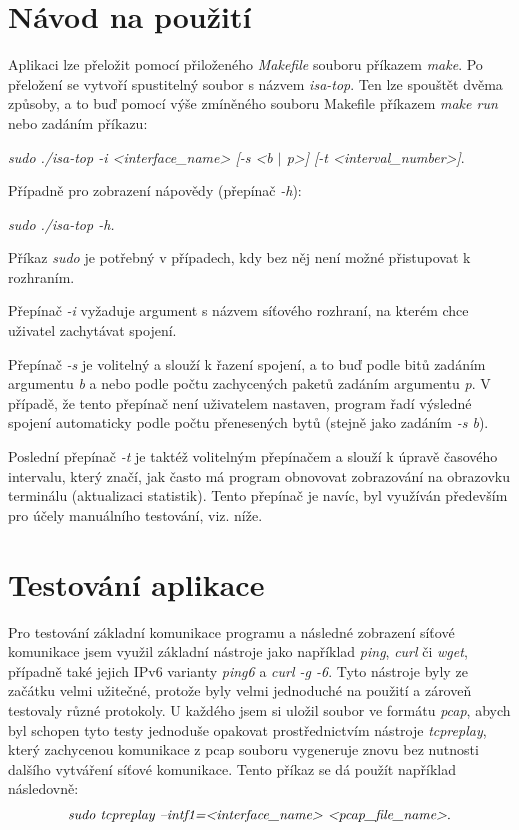 \documentclass[a4paper, 11pt, hidelinks]{article}
\begin{document}
\section{Návod na použití}
Aplikaci lze přeložit pomocí přiloženého \emph{Makefile} souboru příkazem \emph{make}. Po přeložení se vytvoří spustitelný soubor s názvem \emph{isa-top}. Ten lze spouštět dvěma způsoby, a to buď pomocí výše zmíněného souboru Makefile příkazem \emph{make run} nebo zadáním příkazu: 
\begin{center}
    \emph{sudo ./isa-top -i <interface\_name> [-s <b $\mid$ p>] [-t <interval\_number>]}.
\end{center}

Případně pro zobrazení nápovědy (přepínač \emph{-h}):
\begin{center}
    \emph{sudo ./isa-top -h.}
\end{center}

Příkaz \emph{sudo} je potřebný v případech, kdy bez něj není možné přistupovat k rozhraním.

Přepínač \emph{-i} vyžaduje argument s názvem síťového rozhraní, na kterém chce uživatel zachytávat spojení. 

Přepínač \emph{-s} je volitelný a slouží k řazení spojení, a to buď podle bitů zadáním argumentu \emph{b} a nebo podle počtu zachycených paketů zadáním argumentu \emph{p}. V případě, že tento přepínač není uživatelem nastaven, program řadí výsledné spojení automaticky podle počtu přenesených bytů (stejně jako zadáním \emph{-s b}).

Poslední přepínač \emph{-t} je taktéž volitelným přepínačem a slouží k úpravě časového intervalu, který značí, jak často má program obnovovat zobrazování na obrazovku terminálu (aktualizaci statistik). Tento přepínač je navíc, byl využíván především pro účely manuálního testování, viz. níže.

\section{Testování aplikace}
Pro testování základní komunikace programu a následné zobrazení síťové komunikace jsem využil základní nástroje jako například \emph{ping}, \emph{curl} či \emph{wget}, případně také jejich IPv6 varianty \emph{ping6} a \emph{curl -g -6}. Tyto nástroje byly ze začátku velmi užitečné, protože byly velmi jednoduché na použití a zároveň testovaly různé protokoly. U každého jsem si uložil soubor ve formátu \emph{pcap}, abych byl schopen tyto testy jednoduše opakovat prostřednictvím nástroje \emph{tcpreplay}, který  zachycenou komunikace z pcap souboru vygeneruje znovu bez nutnosti dalšího vytváření síťové komunikace. Tento příkaz se dá použít například následovně: $$\emph{sudo tcpreplay --intf1=<interface\_name> <pcap\_file\_name>}.$$
\end{document}
